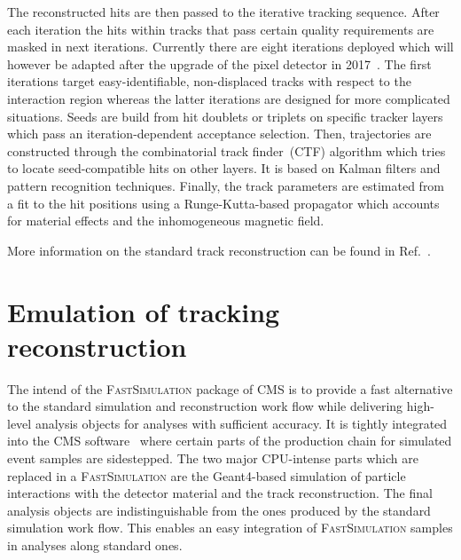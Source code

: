 \documentclass[a4paper]{jpconf}
\begin{document}
The reconstructed hits are then passed to the iterative tracking sequence. After each iteration the hits within tracks that pass certain quality requirements are masked in next iterations. Currently there are eight iterations deployed which will however be adapted after the upgrade of the pixel detector in 2017~\cite{pixelphase1}. The first iterations target easy-identifiable, non-displaced tracks with respect to the interaction region whereas the latter iterations are designed for more complicated situations. Seeds are build from hit doublets or triplets on specific tracker layers which pass an iteration-dependent acceptance selection. Then, trajectories are constructed through the combinatorial track finder~(CTF) algorithm which tries to locate seed-compatible hits on other layers. It is based on Kalman filters and pattern recognition techniques.  Finally, the track parameters are estimated from a fit to the hit positions using a Runge-Kutta-based propagator which accounts for material effects and the inhomogeneous magnetic field.

More information on the standard track reconstruction can be found in Ref.~\cite{trackreco}.


\section{Emulation of tracking reconstruction}

The intend of the \textsc{FastSimulation} package of CMS is to provide a fast alternative to the standard simulation and reconstruction work flow while delivering high-level analysis objects for  analyses with sufficient accuracy. It is tightly integrated into the CMS software~\cite{cmssw} where certain parts of the production chain for simulated event samples are sidestepped. The two major CPU-intense parts which are replaced in a \textsc{FastSimulation} are the Geant4-based simulation of particle interactions with the detector material and the track reconstruction. The final analysis objects are indistinguishable from the ones produced by the standard simulation work flow. This enables an easy integration of \textsc{FastSimulation} samples in analyses along standard ones.
\end{document}
